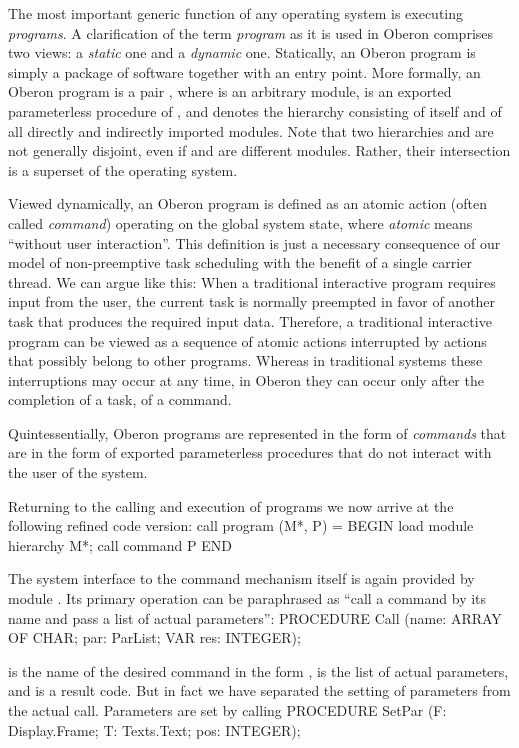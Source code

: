 The most important generic function of any operating system is
executing \emph{programs}. A clarification of the term \emph{program} as it is used
in Oberon comprises two views: a \emph{static} one and a \emph{dynamic}
one. Statically, an Oberon program is simply a package of software
together with an entry point. More formally, an Oberon program is a
pair , where  is an arbitrary module,  is an exported
parameterless procedure of , and  denotes the hierarchy consisting
of  itself and of all directly and indirectly imported modules. Note
that two hierarchies  and  are not generally disjoint, even if 
and  are different modules. Rather, their intersection is a superset
of the operating system.

Viewed dynamically, an Oberon program is defined as an atomic action
(often called \emph{command}) operating on the global system state, where
\emph{atomic} means ``without user interaction''. This definition is just a
necessary consequence of our model of non-preemptive task scheduling
with the benefit of a single carrier thread. We can argue like this:
When a traditional interactive program requires input from the user,
the current task is normally preempted in favor of another task that
produces the required input data. Therefore, a traditional interactive
program can be viewed as a sequence of atomic actions interrupted by
actions that possibly belong to other programs. Whereas in traditional
systems these interruptions may occur at any time, in Oberon they can
occur only after the completion of a task, of a command.

Quintessentially, Oberon programs are represented in the form of
\emph{commands} that are in the form of exported parameterless procedures
that do not interact with the user of the system.

Returning to the calling and execution of programs we now arrive at
the following refined code version:
\begintt
call program (M*, P) = BEGIN
  load module hierarchy M*; call command P
END
\endtt

\noindent The system interface to the command mechanism itself is again provided
by module . Its primary operation can be paraphrased as
``call a command by its name and pass a list of actual parameters'':
\begintt
PROCEDURE Call (name: ARRAY OF CHAR; par: ParList;
                VAR res: INTEGER);
\endtt

\noindent {} is the name of the desired command in the form ,  is the
list of actual parameters, and  is a result code. But in fact we
have separated the setting of parameters from the actual
call. Parameters are set by calling
\begintt
PROCEDURE SetPar (F: Display.Frame; T: Texts.Text;
                  pos: INTEGER);
\endtt

